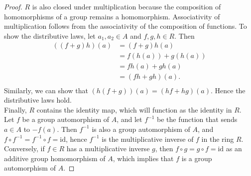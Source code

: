 \documentclass{article}
\begin{document}
\begin{enumerate}[label={\bf Q\arabic*:}]
\begin{proof}
      $R$ is also closed under multiplication because the composition of
      homomorphisms of a group remains a homomorphism. Associativity of
      multiplication follows from the associativity of the composition of
      functions. To show the distributive laws, let $a_1,a_2\in A$ and
      $f,g,h\in R$. Then
      \begin{align*}
        ((f+g)h)(a) &= (f+g)h(a) \\
                    &= f(h(a)) + g(h(a)) \\
                    &= fh(a) + gh(a) \\
                    &= (fh+gh)(a). \\
      \end{align*}
      Similarly, we can show that $(h(f+g))(a)=(hf+hg)(a)$. Hence the
      distributive laws hold. \\

      Finally, $R$ contains the identity map, which will function as the
      identity in $R$. \\

      Let $f$ be a group automorphism of $A$, and let $f^{-1}$ be the
      function that sends $a\in A$ to $-f(a)$. Then $f^{-1}$ is also a
      group automorphism of $A$, and $f\circ f^{-1}=f^{-1}\circ
      f=\text{id}$, hence $f^{-1}$ is the multiplicative inverse of $f$ in
      the ring $R$. Conversely, if $f\in R$ has a multiplicative inverse
      $g$, then $f\circ g=g\circ f=\text{id}$ as an additive group
      homomorphism of $A$, which implies that $f$ is a group automorphism
      of $A$.
    \end{proof}
\end{enumerate}
\end{document}
